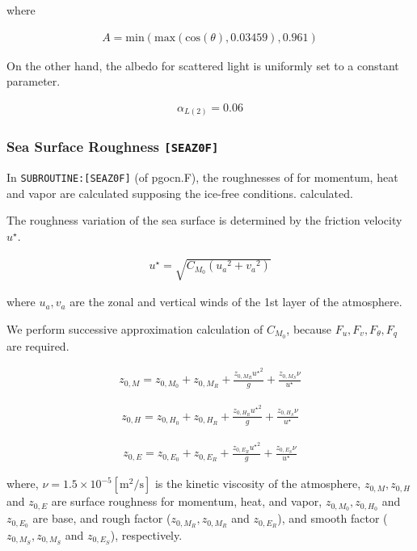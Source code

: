 where

\begin{eqnarray}
    A = \mathrm{min}(\mathrm{max}(\mathrm{cos}(\theta),0.03459),0.961)
\end{eqnarray}

On the other hand, the albedo for scattered light is uniformly set to a
constant parameter.

\begin{eqnarray}
    \alpha_{L(2)} = 0.06
\end{eqnarray}

\hypertarget{sea-surface-roughness-seaz0f}{%
\subsubsection{\texorpdfstring{Sea Surface Roughness
\texttt{{[}SEAZ0F{]}}}{Sea Surface Roughness {[}SEAZ0F{]}}}\label{sea-surface-roughness-seaz0f}}

In \texttt{SUBROUTINE:{[}SEAZ0F{]}} (of pgocn.F), the roughnesses of for
momentum, heat and vapor are calculated supposing the ice-free
conditions. calculated.

The roughness variation of the sea surface is determined by the friction
velocity \(u^\star\).

\begin{eqnarray}
u^{\star} = \sqrt{C_{M_0} ({u_a}^2  +{v_a}^2)}
\end{eqnarray}

where \(u_a,v_a\) are the zonal and vertical winds of the 1st layer of
the atmosphere.

We perform successive approximation calculation of \({C_{M_0}}\),
because \(F_u,F_v,F_\theta,F_q\) are required.

\begin{eqnarray}
    z_{0,M} = z_{0,M_0} + z_{0,M_R} + \frac{z_{0,M_R} {u^\star }^2 }{g} + \frac{z_{0,M_S}\nu }{u^\star}
\end{eqnarray}

\begin{eqnarray}
    z_{0,H} = z_{0,H_0} + z_{0,H_R} + \frac{z_{0,H_R} {u^\star }^2 }{g} + \frac{z_{0,H_S}\nu }{u^\star}
\end{eqnarray}

\begin{eqnarray}
    z_{0,E} = z_{0,E_0} + z_{0,E_R} + \frac{z_{0,E_R} {u^\star }^2 }{g} + \frac{z_{0,E_S}\nu }{u^\star}
\end{eqnarray}

where, \(\nu = 1.5 \times 10^{-5} \mathrm{[m^2/s]}\) is the kinetic
viscosity of the atmosphere, \(z_{0,M},z_{0,H}\) and \(z_{0,E}\) are
surface roughness for momentum, heat, and vapor, \(z_{0,M_0},z_{0,H_0}\)
and \(z_{0,E_0}\) are base, and rough factor (\(z_{0,M_R},z_{0,M_R}\)
and \(z_{0,E_R}\)), and smooth factor (\(z_{0,M_S},z_{0,M_S}\) and
\(z_{0,E_S}\)), respectively.

